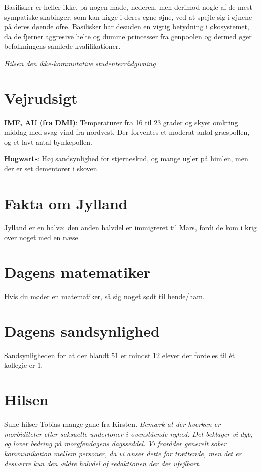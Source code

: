 \begin{minipage}[b]{0.95\linewidth}
\begin{minipage}[t]{0.47\textwidth}
Basilisker er heller ikke, på nogen måde, nederen, men derimod nogle af de mest sympatiske skabinger, som kan kigge i deres egne øjne, ved at spejle sig i øjnene på deres døende ofre. Basilisker har desuden en vigtig betydning i økosystemet, da de fjerner aggresive helte og dumme princesser fra genpoolen og dermed øger befolkningens samlede kvalifikationer.

{\flushright\emph{Hilsen den ikke-kommutative studenterrådgivning}}

\end{minipage}%
\hfill\begin{minipage}[t]{0.47\textwidth}
\vspace{2mm}
\section*{Vejrudsigt}
\textbf{IMF, AU (fra DMI)}: Temperaturer fra 16 til 23 grader og skyet omkring middag med svag vind fra nordvest. Der forventes et moderat antal græspollen, og et lavt antal bynkepollen.

\textbf{Hogwarts}: Høj sandsynlighed for stjerneskud, og mange ugler på himlen, men der er set dementorer i skoven.

\section*{Fakta om Jylland}
Jylland er en halvø: den anden halvdel er immigreret til Mars, fordi de kom i krig over noget med en næse

\section*{Dagens matematiker}
Hvis du møder en matematiker, så sig noget sødt til hende/ham.

\section*{Dagens sandsynlighed}
Sandsynligheden for at der blandt $51$ er mindst $12$ elever der fordeles til ét kollegie er $1$. 

\section*{Hilsen}
Sune hilser Tobias mange gane fra Kirsten.
\vspace{2mm}
\emph{Bemærk at der hverken er morbiditeter eller seksuelle undertoner i ovenstående nyhed. Det beklager vi dyb, og lover bedring på morgfendagens dagsseddel. Vi fraråder generelt sober kommunikation mellem personer, da vi anser dette for trættende, men det er desværre kun den ældre halvdel af redaktionen der der ufejlbart.}
\end{minipage}


\end{minipage}
